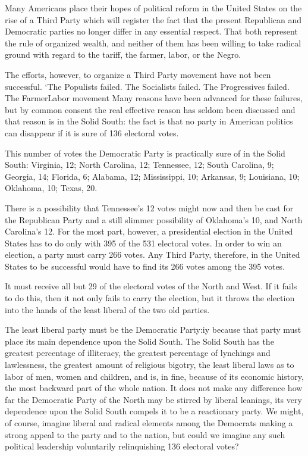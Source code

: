 \documentclass[letterpaper,10pt,english]{jupyterBook}
\begin{document}
\sphinxAtStartPar
Many Americans place their hopes of political reform in the United States on the rise of a Third Party which will register the fact that the present Republican and Democratic parties no longer differ in any essential respect. That both represent the rule of organized wealth, and neither of them has been willing to take radical ground with regard to the tariff, the farmer, labor, or the Negro.

\sphinxAtStartPar
The efforts, however, to organize a Third Party movement have not been successful. ‘The Populists failed. The Socialists failed. The Progressives failed. The Farmer\sphinxhyphen{}Labor movement Many reasons have been advanced for these failures, but by common consent the real effective reason has seldom been discussed and that reason is in the Solid South: the fact is that no party in American politics can disappear if it is sure of 136 electoral votes.

\sphinxAtStartPar
This number of votes the Democratic Party is practically sure of in the Solid South: Virginia, 12; North Carolina, 12; Tennessee, 12; South Carolina, 9; Georgia, 14; Florida, 6; Alabama, 12; Mississippi, 10; Arkansas, 9; Louisiana, 10; Oklahoma, 10; Texas, 20.

\sphinxAtStartPar
There is a possibility that Tennessee’s 12 votes might now and then be cast for the Republican Party and a still slimmer possibility of Oklahoma’s 10, and North Carolina’s 12. For the most part, however, a presidential election in the United States has to do only with 395 of the 531 electoral votes. In order to win an election, a party must carry 266 votes. Any Third Party, therefore, in the United States to be successful would have to find its 266 votes among the 395 votes.

\sphinxAtStartPar
It must receive all but 29 of the electoral votes of the North and West. If it fails to do this, then it not only fails to carry the election, but it throws the election into the hands of the least liberal of the two old parties.

\sphinxAtStartPar
The least liberal party must be the Democratic Party:iy because that party must place its main dependence upon the Solid South. The Solid South has the greatest percentage of illiteracy, the greatest percentage of lynchings and lawlessness, the greatest amount of religious bigotry, the least liberal laws as to labor of men, women and children, and is, in fine, because of its economic history, the most backward part of the whole nation. It does not make any difference how far the Democratic Party of the North may be stirred by liberal leanings, its very dependence upon the Solid South compels it to be a reactionary party. We might, of course, imagine liberal and radical elements among the Democrats making a strong appeal to the party and to the nation, but could we imagine any such political leadership voluntarily relinquishing 136 electoral votes?
\end{document}
